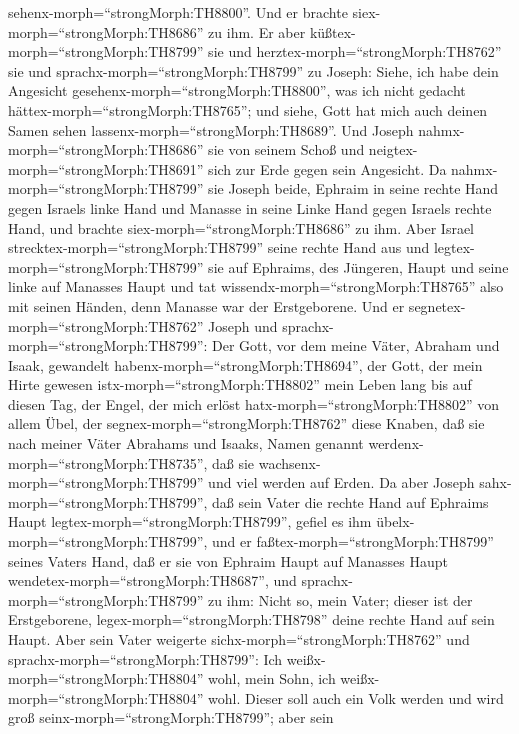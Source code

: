 sehenx-morph=``strongMorph:TH8800''. Und er brachte
siex-morph=``strongMorph:TH8686'' zu ihm. Er aber
küßtex-morph=``strongMorph:TH8799'' sie und
herztex-morph=``strongMorph:TH8762'' sie  und
sprachx-morph=``strongMorph:TH8799'' zu Joseph: Siehe, ich habe dein
Angesicht gesehenx-morph=``strongMorph:TH8800'', was ich nicht gedacht
hättex-morph=``strongMorph:TH8765''; und siehe, Gott hat mich auch
deinen Samen sehen lassenx-morph=``strongMorph:TH8689''. 
Und Joseph nahmx-morph=``strongMorph:TH8686'' sie von seinem Schoß und
neigtex-morph=``strongMorph:TH8691'' sich zur Erde gegen sein Angesicht.
 Da nahmx-morph=``strongMorph:TH8799'' sie Joseph beide,
Ephraim in seine rechte Hand gegen Israels linke Hand und Manasse in
seine Linke Hand gegen Israels rechte Hand, und brachte
siex-morph=``strongMorph:TH8686'' zu ihm.  Aber Israel
strecktex-morph=``strongMorph:TH8799'' seine rechte Hand aus und
legtex-morph=``strongMorph:TH8799'' sie auf Ephraims, des Jüngeren,
Haupt und seine linke auf Manasses Haupt und tat
wissendx-morph=``strongMorph:TH8765'' also mit seinen Händen, denn
Manasse war der Erstgeborene.  Und er
segnetex-morph=``strongMorph:TH8762'' Joseph und
sprachx-morph=``strongMorph:TH8799'': Der Gott, vor dem meine Väter,
Abraham und Isaak, gewandelt habenx-morph=``strongMorph:TH8694'', der
Gott, der mein Hirte gewesen istx-morph=``strongMorph:TH8802'' mein
Leben lang bis auf diesen Tag,  der Engel, der mich erlöst
hatx-morph=``strongMorph:TH8802'' von allem Übel, der
segnex-morph=``strongMorph:TH8762'' diese Knaben, daß sie nach meiner
Väter Abrahams und Isaaks, Namen genannt
werdenx-morph=``strongMorph:TH8735'', daß sie
wachsenx-morph=``strongMorph:TH8799'' und viel werden auf Erden.
 Da aber Joseph sahx-morph=``strongMorph:TH8799'', daß sein
Vater die rechte Hand auf Ephraims Haupt
legtex-morph=``strongMorph:TH8799'', gefiel es ihm
übelx-morph=``strongMorph:TH8799'', und er
faßtex-morph=``strongMorph:TH8799'' seines Vaters Hand, daß er sie von
Ephraim Haupt auf Manasses Haupt wendetex-morph=``strongMorph:TH8687'',
 und sprachx-morph=``strongMorph:TH8799'' zu ihm: Nicht so,
mein Vater; dieser ist der Erstgeborene,
legex-morph=``strongMorph:TH8798'' deine rechte Hand auf sein Haupt.
 Aber sein Vater weigerte
sichx-morph=``strongMorph:TH8762'' und
sprachx-morph=``strongMorph:TH8799'': Ich
weißx-morph=``strongMorph:TH8804'' wohl, mein Sohn, ich
weißx-morph=``strongMorph:TH8804'' wohl. Dieser soll auch ein Volk
werden und wird groß seinx-morph=``strongMorph:TH8799''; aber sein
